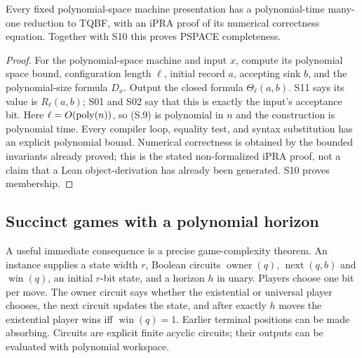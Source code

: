 \begin{theorem}
\label{thm:S12}
Every fixed polynomial-space machine presentation has a polynomial-time
many-one reduction to TQBF, with an iPRA proof of its numerical
correctness equation.  Together with S10 this proves PSPACE completeness.
\end{theorem}
\begin{proof}
For the polynomial-space machine and input $x$, compute its polynomial
space bound, configuration length $\ell$, initial record $a$, accepting
sink $b$, and the polynomial-size formula $D_x$.  Output the closed
formula $\Theta_\ell(a,b)$.  S11 says its value is $R_\ell(a,b)$;
S01 and S02 say that this is exactly the input's acceptance bit.
Here $\ell=O(\operatorname{poly}(n))$, so (S.9) is polynomial in $n$ and the
construction is polynomial time.  Every compiler loop, equality test,
and syntax substitution has an explicit polynomial bound.  Numerical
correctness is obtained by the bounded invariants already proved;
this is the stated non-formalized iPRA proof, not a claim that a Lean
object-derivation has already been generated.  S10 proves membership.
\end{proof}

\subsection{Succinct games with a polynomial horizon}

A useful immediate consequence is a precise game-complexity theorem.
An instance supplies a state width $r$, Boolean circuits
$\operatorname{owner}(q)$, $\operatorname{next}(q,b)$ and
$\operatorname{win}(q)$, an initial $r$-bit state, and a horizon $h$
in unary.  Players choose one bit per move.  The owner circuit says
whether the existential or universal player chooses, the next circuit
updates the state, and after exactly $h$ moves the existential player
wins iff $\operatorname{win}(q)=1$.  Earlier terminal positions can be
made absorbing.  Circuits are explicit finite acyclic circuits; their
outputs can be evaluated with polynomial workspace.

